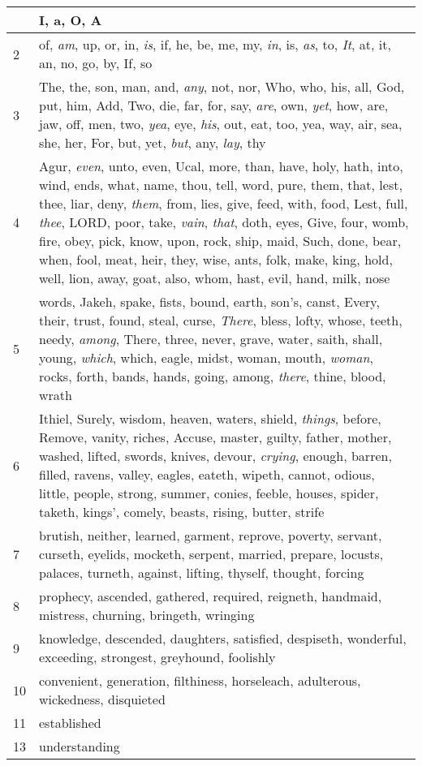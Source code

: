 \begin{center}
\begin{longtable}{l|p{3.75in}}
\hline \hline 
\endlastfoot 
1 & I, a, O, A\\ \hline 
2 & of, \emph{am}, up, or, in, \emph{is}, if, he, be, me, my, \emph{in}, is, \emph{as}, to, \emph{It}, at, it, an, no, go, by, If, so\\ \hline 
3 & The, the, son, man, and, \emph{any}, not, nor, Who, who, his, all, God, put, him, Add, Two, die, far, for, say, \emph{are}, own, \emph{yet}, how, are, jaw, off, men, two, \emph{yea}, eye, \emph{his}, out, eat, too, yea, way, air, sea, she, her, For, but, yet, \emph{but}, any, \emph{lay}, thy\\ \hline 
4 & Agur, \emph{even}, unto, even, Ucal, more, than, have, holy, hath, into, wind, ends, what, name, thou, tell, word, pure, them, that, lest, thee, liar, deny, \emph{them}, from, lies, give, feed, with, food, Lest, full, \emph{thee}, LORD, poor, take, \emph{vain}, \emph{that}, doth, eyes, Give, four, womb, fire, obey, pick, know, upon, rock, ship, maid, Such, done, bear, when, fool, meat, heir, they, wise, ants, folk, make, king, hold, well, lion, away, goat, also, whom, hast, evil, hand, milk, nose\\ \hline 
5 & words, Jakeh, spake, fists, bound, earth, son's, canst, Every, their, trust, found, steal, curse, \emph{There}, bless, lofty, whose, teeth, needy, \emph{among}, There, three, never, grave, water, saith, shall, young, \emph{which}, which, eagle, midst, woman, mouth, \emph{woman}, rocks, forth, bands, hands, going, among, \emph{there}, thine, blood, wrath\\ \hline 
6 & Ithiel, Surely, wisdom, heaven, waters, shield, \emph{things}, before, Remove, vanity, riches, Accuse, master, guilty, father, mother, washed, lifted, swords, knives, devour, \emph{crying}, enough, barren, filled, ravens, valley, eagles, eateth, wipeth, cannot, odious, little, people, strong, summer, conies, feeble, houses, spider, taketh, kings', comely, beasts, rising, butter, strife\\ \hline 
7 & brutish, neither, learned, garment, reprove, poverty, servant, curseth, eyelids, mocketh, serpent, married, prepare, locusts, palaces, turneth, against, lifting, thyself, thought, forcing\\ \hline 
8 & prophecy, ascended, gathered, required, reigneth, handmaid, mistress, churning, bringeth, wringing\\ \hline 
9 & knowledge, descended, daughters, satisfied, despiseth, wonderful, exceeding, strongest, greyhound, foolishly\\ \hline 
10 & convenient, generation, filthiness, horseleach, adulterous, wickedness, disquieted\\ \hline 
11 & established\\ \hline 
13 & understanding\\ \hline 
\end{longtable} 
\end{center} 




 
